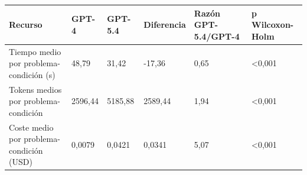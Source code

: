 \begin{tabular}{llllll}
\toprule
Recurso & GPT-4 & GPT-5.4 & Diferencia & Razón GPT-5.4/GPT-4 & p Wilcoxon-Holm \\
\midrule
Tiempo medio por problema-condición (s) & 48,79 & 31,42 & -17,36 & 0,65 & <0,001 \\
Tokens medios por problema-condición & 2596,44 & 5185,88 & 2589,44 & 1,94 & <0,001 \\
Coste medio por problema-condición (USD) & 0,0079 & 0,0421 & 0,0341 & 5,07 & <0,001 \\
\bottomrule
\end{tabular}
